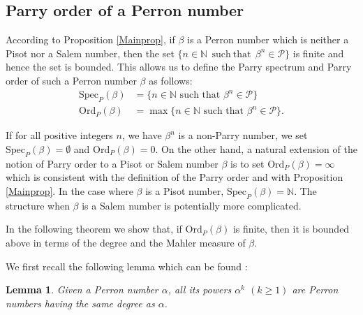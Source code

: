 \documentclass[12pt]{article}
\theoremstyle{plain}
\newtheorem{lemma}[theorem]{Lemma}
\theoremstyle{remark}
\newcommand{\OrdP}{\mathrm{Ord}_{P}}
\newcommand{\SpecP}{\mathrm{Spec}_{P}}
\begin{document}
\subsection{Parry order of a Perron number}
According to Proposition \ref{Mainprop}, if $\beta$ is a Perron number which is neither a Pisot nor a Salem number, then the set $\{n\in \mathbb{N} ~~\mathrm{such~that} ~~ \beta^n \in \mathcal{P}\}$ is finite and hence the set is bounded. This allows us to define the Parry spectrum and Parry order of such a Perron number $\beta$ as follows:
\begin{align*}
\SpecP(\beta) & = \{n \in \mathbb{N} \text{ such that } \beta^n \in \mathcal{P}\} \\
\OrdP(\beta)& = \max\{n\in \mathbb{N} \text{ such that } \beta^n \in \mathcal{P}\}.
\end{align*}

If for all positive integers $n$, we have $\beta^n $ is a non-Parry number, we set $\SpecP(\beta) = \emptyset$ and $\OrdP(\beta)=0$. On the other hand, a natural extension of the notion of Parry order to a Pisot or Salem number $\beta$ is to set 
$\OrdP(\beta)=\infty$ which is consistent with the definition of the Parry order and with Proposition \ref{Mainprop}.
In the case where $\beta$ is a Pisot number, $\SpecP(\beta) = \mathbb{N}$.
The structure when $\beta$ is a Salem number is potentially more complicated.

 In the following theorem we show that, if $ \OrdP(\beta)$ is finite, then it is bounded above in terms of the degree and the Mahler measure of $\beta$.

 We first recall the following lemma which can be found \cite{HichriSmyth2024}: 
\begin{lemma}
 \label{lem:perronpowers}
 Given a Perron number $\alpha$, all its powers $\alpha^k$ $(k \ge 1)$ are Perron numbers having the same degree as $\alpha$.
\end{lemma}
\end{document}
